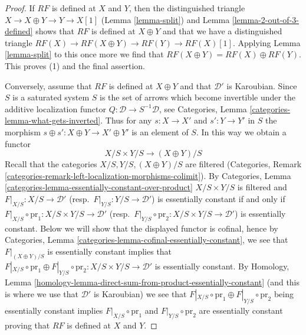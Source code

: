 \begin{proof}
If $RF$ is defined at $X$ and $Y$, then the distinguished triangle
$X \to X \oplus Y \to Y \to X[1]$ (Lemma \ref{lemma-split}) and
Lemma \ref{lemma-2-out-of-3-defined}
shows that $RF$ is defined at $X \oplus Y$ and that we
have a distinguished triangle
$RF(X) \to RF(X \oplus Y) \to RF(Y) \to RF(X)[1]$.
Applying Lemma \ref{lemma-split} to this once more we find
that $RF(X \oplus Y) = RF(X) \oplus RF(Y)$.
This proves (1) and the final assertion.

\medskip\noindent
Conversely, assume that $RF$ is defined at $X \oplus Y$ and that $\mathcal{D}'$
is Karoubian. Since $S$ is a saturated system $S$ is the set of arrows which
become invertible under the additive localization functor
$Q : \mathcal{D} \to S^{-1}\mathcal{D}$, see
Categories, Lemma \ref{categories-lemma-what-gets-inverted}.
Thus for any $s : X \to X'$ and $s' : Y \to Y'$ in $S$ the morphism
$s \oplus s' : X \oplus Y \to X' \oplus Y'$ is an element of $S$.
In this way we obtain a functor
$$
X/S \times Y/S \longrightarrow (X \oplus Y)/S
$$
Recall that the categories $X/S, Y/S, (X \oplus Y)/S$ are filtered
(Categories, Remark
\ref{categories-remark-left-localization-morphisms-colimit}).
By Categories, Lemma \ref{categories-lemma-essentially-constant-over-product}
$X/S \times Y/S$ is filtered and
$F|_{X/S} : X/S \to \mathcal{D}'$ (resp.\ $F|_{Y/S} : Y/S \to \mathcal{D}'$)
is essentially constant if and only if
$F|_{X/S} \circ \text{pr}_1 : X/S \times Y/S \to \mathcal{D}'$
(resp.\ $F|_{Y/S} \circ \text{pr}_2 : X/S \times Y/S \to \mathcal{D}'$)
is essentially constant. Below we will show that the displayed functor
is cofinal, hence by
Categories, Lemma \ref{categories-lemma-cofinal-essentially-constant},
we see that $F|_{(X \oplus Y)/S}$ is essentially constant implies that
$F|_{X/S} \circ \text{pr}_1 \oplus F|_{Y/S} \circ \text{pr}_2 :
X/S \times Y/S \to \mathcal{D}'$
is essentially constant. By Homology, Lemma
\ref{homology-lemma-direct-sum-from-product-essentially-constant}
(and this is where we use that $\mathcal{D}'$ is Karoubian)
we see that 
$F|_{X/S} \circ \text{pr}_1 \oplus F|_{Y/S} \circ \text{pr}_2$
being essentially constant implies
$F|_{X/S} \circ \text{pr}_1$ and
$F|_{Y/S} \circ \text{pr}_2$ are essentially constant proving that $RF$ is
defined at $X$ and $Y$.


\end{proof}
